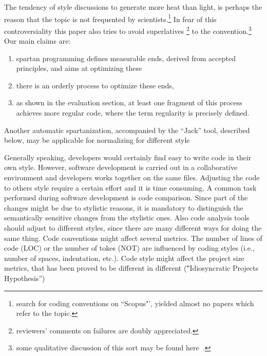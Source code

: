 The tendency of style discussions to generate more heat than light, is perhaps
the reason that the topic is not frequented by scientists.\footnote{%
  search for coding conventions on ``Scopus"', yielded almost no papers which
refer to the topic.} In fear of this controversiality this paper also tries to
avoid  superlatives \footnote{reviewers' comments on failures are doubly
  appreciated.} to the convention.\footnote{some qualitative discussion of this 
  sort may be found here~\cite{Gil:2010}.} Our main claims are: 
\begin{enumerate}
    \item spartan programming defines measurable ends, derived from 
      accepted principles, and aims at optimizing these
    \item there is an orderly process to optimize these ends, 
    \item as shown in the evaluation section, at least one fragment of this
      process achieves more regular code, where the term regularity is
      precisely defined.
\end{enumerate}

Another
automatic spartanization, accompanied by the ``Jack'' tool,
        described below, may be applicable for normalizing for different
        style

Generally speaking, developers would certainly find easy to write code in their own style.
However, software development is carried out in a collaborative environment and developers
works together on the same files. Adjusting the code to others style require a certain effort
and it is time consuming. A common task performed during software development is code comparison.
Since part of the changes might be due to stylistic reasons, it is mandatory to distinguish the
semantically sensitive changes from the stylistic ones.
Also code analysis tools should adjust to different styles, since there are many
different ways for doing the same thing.
Code conventions might affect several metrics. The number of lines of code
(LOC) or the number of tokes (NOT) are influenced by coding styles (i.e.,
number of spaces, indentation, etc.). Code style might affect the project size
metrics, that has been proved to be different in different (‟Idiosyncratic
Projects
Hypothesis”)~\cite{Gil:Lalouche:16}~\cite{Gil:2011:Goldstein:Moshkovich:2011}

